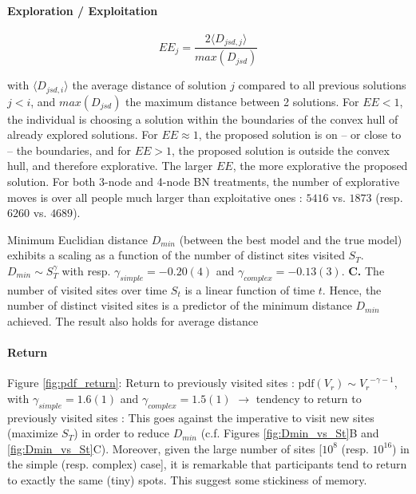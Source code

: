 \paragraph{Exploration / Exploitation}


\begin{equation}
EE_{j} = \frac{2 \langle D_{jsd,j} \rangle}{max(D_{jsd})}  
\end{equation}

with $\langle D_{jsd,i} \rangle$ the average distance of solution $j$ compared to all previous solutions $j < i$, and $ max(D_{jsd})$ the maximum distance between 2 solutions. For $EE < 1$, the individual is choosing a solution within the boundaries of the convex hull of already explored solutions. For $EE \approx 1$, the proposed solution is on -- or close to -- the boundaries, and for $EE > 1$, the proposed solution is outside the convex hull, and therefore explorative. The larger $EE$, the more explorative the proposed solution. For both 3-node and 4-node BN treatments,  the number of explorative moves is over all people much larger than exploitative ones :  $5416$ vs. $1873$ (resp. $6260$ vs. $4689$). 

Minimum Euclidian distance $D_{min}$ (between the best model and the true model) exhibits a scaling as a function of the number of distinct sites visited $S_{T}$. $D_{min} \sim S_{T}^{\gamma}$ with resp. $\gamma_{simple} = -0.20(4)$ and $\gamma_{complex} = - 0.13(3)$. {\bf C.} The number of visited sites over time $S_t$ is a linear function of time $t$. Hence, the number of distinct visited sites is a predictor of the minimum distance $D_{min}$ achieved. The result also holds for average distance

\paragraph{Return}
Figure \ref{fig:pdf_return}: Return to previously visited sites : $\mathrm{pdf}(V_r) \sim {V_r}^{- \gamma -1}$, with $\gamma_{simple} = 1.6(1)$ and $\gamma_{complex} = 1.5(1)$ $\rightarrow$ tendency to return to previously visited sites : This goes against the imperative to visit new sites (maximize $S_T$) in order to reduce $D_{min}$ (c.f. Figures \ref{fig:Dmin_vs_St}B and \ref{fig:Dmin_vs_St}C). Moreover, given the large number of sites [$10^{8}$ (resp. $10^{16}$) in the simple (resp. complex) case], it is remarkable that participants tend to return to exactly the same (tiny) spots. This suggest some stickiness of memory.


